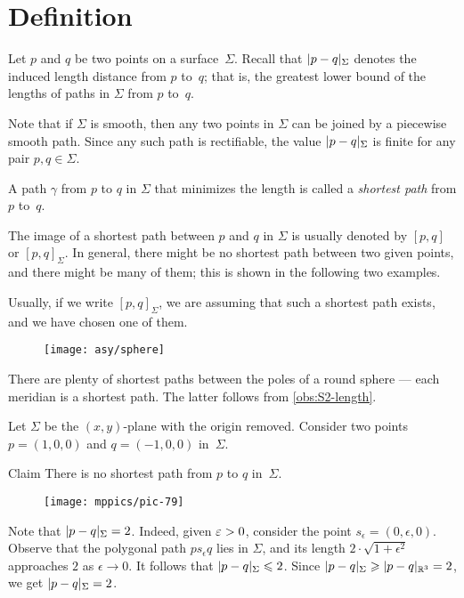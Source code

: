 \section{Definition}

Let $p$ and $q$ be two points on a surface~$\Sigma$.
Recall that $\dist{p}{q}\Sigma$ denotes the induced length distance from $p$ to~$q$;
that is, the greatest lower bound of the lengths of paths in $\Sigma$ from $p$ to~$q$.

Note that if $\Sigma$ is smooth, then any two points in $\Sigma$ can be joined by a piecewise smooth path.
Since any such path is rectifiable, the value $\dist{p}{q}\Sigma$ is finite for any pair $p,q\in\Sigma$.

A path $\gamma$ from $p$ to $q$ in $\Sigma$ that minimizes the length is called a \emph{shortest path} from $p$ to~$q$.

The image of a shortest path between $p$ and $q$ in $\Sigma$ is usually denoted by $[p,q]$ or $[p,q]_\Sigma$.
In general, there might be no shortest path between two given points, and there might be many of them;
this is shown in the following two examples.

Usually, if we write $[p,q]_\Sigma$, we are assuming that such a shortest path exists, and we have chosen one of them.

{

\begin{wrapfigure}{r}{28 mm}
\vskip-6mm
\centering
\texttt{[image: asy/sphere]}
\end{wrapfigure}

 There are plenty of shortest paths between the poles of a round sphere --- each meridian is a shortest path.
The latter follows from \ref{obs:S2-length}.

 Let $\Sigma$ be the $(x,y)$-plane with the origin removed.
Consider two points $p=(1,0,0)$ and $q=(-1,0,0)$ in~$\Sigma$.

}

\begin{thm}{Claim}
There is no shortest path from $p$ to $q$ in~$\Sigma$.
\end{thm}

\begin{wrapfigure}{r}{28 mm}
\vskip-4mm
\centering
\texttt{[image: mppics/pic-79]}
\end{wrapfigure}

Note that $\dist{p}{q}\Sigma=2$. 
Indeed, given $\epsilon\z>0$, consider the point $s_\epsilon=(0,\epsilon,0)$.
Observe that the polygonal path $ps_\epsilon q$ lies in $\Sigma$, and its length $2\cdot\sqrt{1+\epsilon^2}$ approaches $2$ as $\epsilon\to0$.
It follows that $\dist{p}{q}\Sigma\le 2$.
Since $\dist{p}{q}\Sigma\z\ge \dist{p}{q}{\mathbb{R}^3}=2$, we get $\dist{p}{q}\Sigma=2$.


